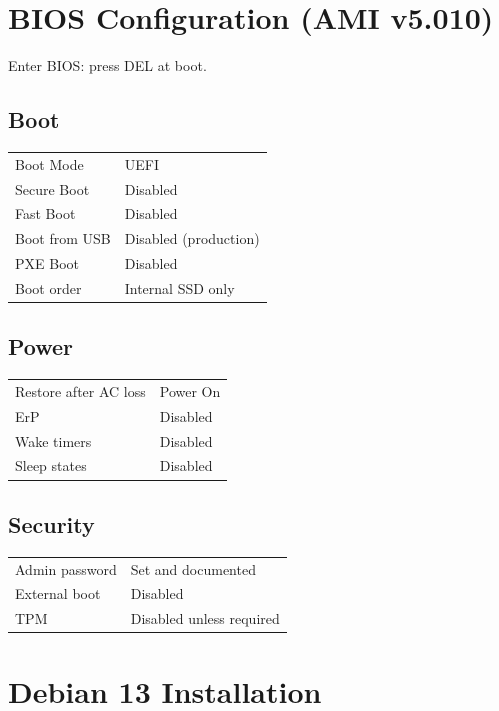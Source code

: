\documentclass[11pt,letterpaper]{article}
\begin{document}
\section{BIOS Configuration (AMI v5.010)}

Enter BIOS: press DEL at boot.

\subsection{Boot}

\begin{longtable}{p{3in} p{2in}}
Boot Mode & UEFI \\
Secure Boot & Disabled \\
Fast Boot & Disabled \\
Boot from USB & Disabled (production) \\
PXE Boot & Disabled \\
Boot order & Internal SSD only \\
\end{longtable}

\subsection{Power}

\begin{longtable}{p{3in} p{2in}}
Restore after AC loss & Power On \\
ErP & Disabled \\
Wake timers & Disabled \\
Sleep states & Disabled \\
\end{longtable}

\subsection{Security}

\begin{longtable}{p{3in} p{2in}}
Admin password & Set and documented \\
External boot & Disabled \\
TPM & Disabled unless required \\
\end{longtable}

\section{Debian 13 Installation}
\end{document}
